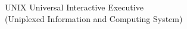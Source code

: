 \begin{tabbing}
    \>UNIX \>\>Universal Interactive Executive\\
        \>\>\>(Uniplexed Information and Computing System)\\






















\end{tabbing}
